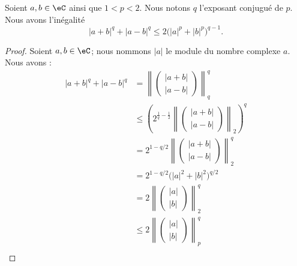 	\begin{lemma}       \label{LEMooLTROooVusGte}
		Soient \( a,b\in \eC\) ainsi que \( 1<p<2\). Nous notons \( q\) l'exposant conjugué de \( p\). Nous avons l'inégalité
		\begin{equation}
			| a+b |^q+| a-b |^q\leq 2\big( | a |^p+| b |^p \big)^{q-1}.
		\end{equation}
	\end{lemma}

	\begin{proof}
		Soient \( a,b\in \eC\); nous nommons \( | a |\) le module du nombre complexe \( a\). Nous avons :
		\begin{subequations}
			\begin{align}
				| a+b |^q+| a-b |^q & =\left\|   \begin{pmatrix}
					| a+b | \\
					| a-b |
				\end{pmatrix}\right\|_q^q                                                                                 \\
				                    & \leq \left( 2^{\frac{1}{ q }-\frac{1}{ 2 }}\left\|  \begin{pmatrix}
					| a+b | \\
					| a-b |
				\end{pmatrix}\right\|_2 \right)^q    \label{SUBEQooYYRIooQTWyZd} \\
				                    & =2^{1-q/2}\left\|   \begin{pmatrix}
					| a+b | \\
					| a-b |
				\end{pmatrix}\right\|_2^q                                                                        \\
				                    & = 2^{1-q/2}\big( | a |^2+| b |^2 \big)^{q/2}       \label{SUBEQooRMVZooLlLvmf}                                                     \\
				                    & =2\left\| \begin{pmatrix}
					| a | \\
					| b |
				\end{pmatrix}\right\|_2^q                                                                                  \\
				                    & \leq 2\left\| \begin{pmatrix}
					| a | \\
					| b |
				\end{pmatrix}\right\|_p^q       \label{SUBEQooKZKSooEjwQpm}                                            \\

\end{align}
\end{subequations}
\end{proof}
